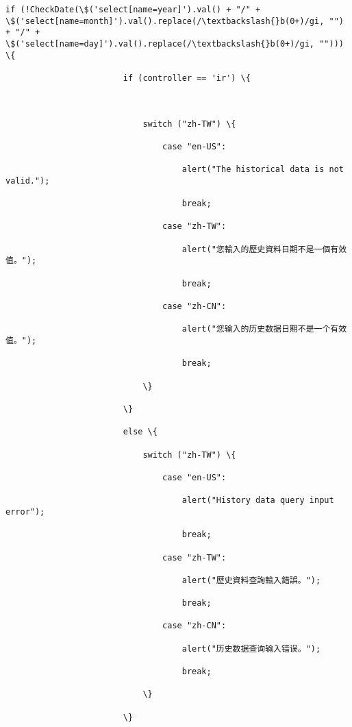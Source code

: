 \documentclass[11pt]{article}
\begin{document}
\begin{Verbatim}[commandchars=\\\{\}]
                    if (!CheckDate(\$('select[name=year]').val() + "/" + \$('select[name=month]').val().replace(/\textbackslash{}b(0+)/gi, "") + "/" + \$('select[name=day]').val().replace(/\textbackslash{}b(0+)/gi, ""))) \{

                        if (controller == 'ir') \{



                            switch ("zh-TW") \{

                                case "en-US":

                                    alert("The historical data is not valid.");

                                    break;

                                case "zh-TW":

                                    alert("您輸入的歷史資料日期不是一個有效值。");

                                    break;

                                case "zh-CN":

                                    alert("您输入的历史数据日期不是一个有效值。");

                                    break;

                            \}

                        \}

                        else \{

                            switch ("zh-TW") \{

                                case "en-US":

                                    alert("History data query input error");

                                    break;

                                case "zh-TW":

                                    alert("歷史資料查詢輸入錯誤。");

                                    break;

                                case "zh-CN":

                                    alert("历史数据查询输入错误。");

                                    break;

                            \}

                        \}


\end{Verbatim}
\end{document}

